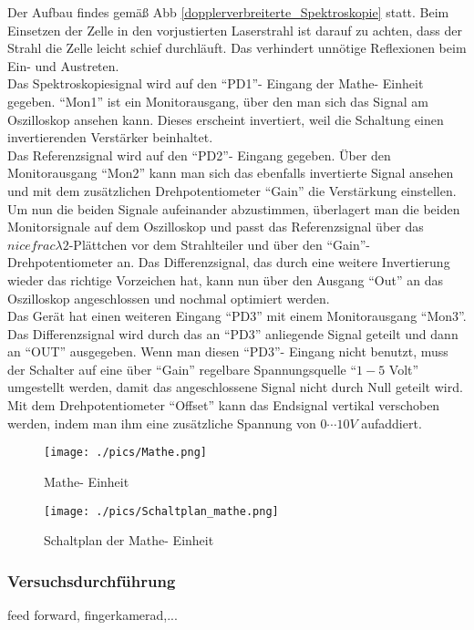 \documentclass[a4paper,oneside]{article}
\begin{document}
Der Aufbau findes gemäß Abb \ref{dopplerverbreiterte_Spektroskopie} statt. Beim Einsetzen der Zelle in den vorjustierten Laserstrahl ist darauf zu achten, dass der Strahl die Zelle leicht schief durchläuft. Das verhindert unnötige Reflexionen beim Ein- und Austreten.\\
Das Spektroskopiesignal wird auf den ``PD1''- Eingang der Mathe- Einheit gegeben. ``Mon1'' ist ein Monitorausgang, über den man sich das Signal am Oszilloskop ansehen kann. Dieses erscheint invertiert, weil die Schaltung einen invertierenden Verstärker beinhaltet.\\
Das Referenzsignal wird auf den ``PD2''- Eingang gegeben. Über den Monitorausgang ``Mon2'' kann man sich das ebenfalls invertierte Signal ansehen und mit dem zusätzlichen Drehpotentiometer ``Gain'' die Verstärkung einstellen. Um nun die beiden Signale aufeinander abzustimmen, überlagert man die beiden Monitorsignale auf dem Oszilloskop und passt das Referenzsignal über das $nicefrac{\lambda}{2}$-Plättchen vor dem Strahlteiler und über den ``Gain''- Drehpotentiometer an. Das Differenzsignal, das durch eine weitere Invertierung wieder das richtige Vorzeichen hat, kann nun über den Ausgang ``Out'' an das Oszilloskop angeschlossen und nochmal optimiert werden.\\
Das Gerät hat einen weiteren Eingang ``PD3'' mit einem Monitorausgang ``Mon3''. Das Differenzsignal wird durch das an ``PD3'' anliegende Signal geteilt und dann an ``OUT'' ausgegeben. Wenn man diesen ``PD3''- Eingang nicht benutzt, muss der Schalter auf eine über ``Gain'' regelbare Spannungsquelle ``$1-5$ Volt'' umgestellt werden, damit das angeschlossene Signal nicht durch Null geteilt wird. Mit dem Drehpotentiometer ``Offset'' kann das Endsignal vertikal verschoben werden, indem man ihm eine zusätzliche Spannung von $0\cdots10V$ aufaddiert.

\begin{figure}
 \centering
 \texttt{[image: ./pics/Mathe.png]}
 \caption{Mathe- Einheit}
\end{figure}
\begin{figure}
 \centering
 \texttt{[image: ./pics/Schaltplan\_mathe.png]}
 \caption{Schaltplan der Mathe- Einheit}
\end{figure}

\subsubsection{Versuchsdurchführung}
feed forward, fingerkamerad,...
\end{document}
